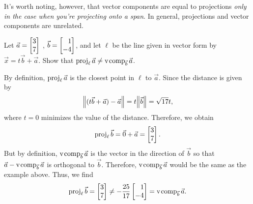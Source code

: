 It's worth noting, however, that vector components are equal to projections \emph{only in the case when you're
projecting onto a span}. In general, projections and vector components are unrelated. 

\begin{example}
	Let $\vec a=\mat{3\\7}$ , $\vec b=\mat{1\\-4}$, and let $\ell$ be the line given in vector form by
	$\vec x=t\vec b+\vec a$. Show that $\operatorname{proj}_\ell\vec a\neq \operatorname{v\hspace{1pt}comp}_{\vec b}\vec a$.

	By definition, $\operatorname{proj}_{\ell}\vec a$ is the closest point in $\ell$ to $\vec a$. Since the distance is given by
	\[
	    \norm*{(t\vec b+\vec a)-\vec a}=t\norm*{\vec b}=\sqrt{17}t,
	\]
	where $t=0$ minimizes the value of the distance. Therefore, we obtain
	\[
	    \Proj_{\ell}\vec b = \vec 0 + \vec a = \mat{3\\7}.
	\]
	But by definition, $\operatorname{v\hspace{1pt}comp}_{\vec b}\vec a$ is the vector in the direction of $\vec b$ so that $\vec a - \operatorname{v\hspace{1pt}comp}_{\vec b}\vec a$ is orthogonal to $\vec b$. Therefore, $\operatorname{v\hspace{1pt}comp}_{\vec b}\vec a$ would be the same as the example above. Thus, we find 
	\[
	    \Proj_{\ell}\vec b=\mat{3\\7}\neq-\frac{25}{17}\mat{1\\-4}=\Vcomp_{\vec b}\vec a.
	\]
	
\end{example}

